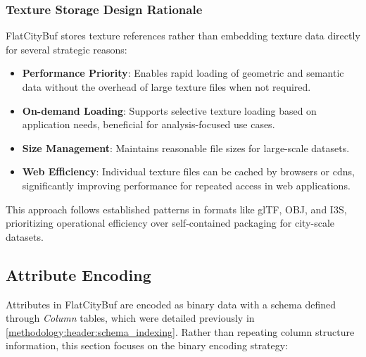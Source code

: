 \subsubsection{Texture Storage Design Rationale}
\label{methodology:feature_encoding:textures:rationale}

FlatCityBuf stores texture references rather than embedding texture data directly for several strategic reasons:

\begin{itemize}
  \item \textbf{Performance Priority}: Enables rapid loading of geometric and semantic data without the overhead of large texture files when not required.

  \item \textbf{On-demand Loading}: Supports selective texture loading based on application needs, beneficial for analysis-focused use cases.

  \item \textbf{Size Management}: Maintains reasonable file sizes for large-scale datasets.

  \item \textbf{Web Efficiency}: Individual texture files can be cached by browsers or \ac{cdn}s, significantly improving performance for repeated access in web applications.
\end{itemize}

This approach follows established patterns in formats like glTF, OBJ, and I3S, prioritizing operational efficiency over self-contained packaging for city-scale datasets.

\subsection{Attribute Encoding}
\label{methodology:feature_encoding:attribute_encoding}

Attributes in FlatCityBuf are encoded as binary data with a schema defined through \textit{Column} tables, which were detailed previously in \autoref{methodology:header:schema_indexing}. Rather than repeating column structure information, this section focuses on the binary encoding strategy:

